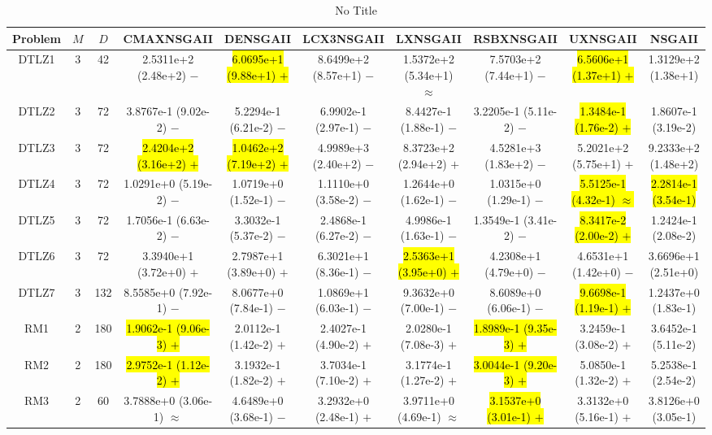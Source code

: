 \documentclass[journal]{IEEEtran}
\begin{document}
\begin{table*}[htbp]
\renewcommand{\arraystretch}{1.2}
\centering
\caption{No Title}
\begin{tabular}{cccccccccc}
\toprule
Problem&$M$&$D$&CMAXNSGAII&DENSGAII&LCX3NSGAII&LXNSGAII&RSBXNSGAII&UXNSGAII&NSGAII\\
\midrule
\multirow{1}{*}{DTLZ1}&3&42&2.5311e+2 (2.48e+2) $-$&\hl{6.0695e+1 (9.88e+1) $+$}&8.6499e+2 (8.57e+1) $-$&1.5372e+2 (5.34e+1) $\approx$&7.5703e+2 (7.44e+1) $-$&\hl{6.5606e+1 (1.37e+1) $+$}&1.3129e+2 (1.38e+1)\\
\hline
\multirow{1}{*}{DTLZ2}&3&72&3.8767e-1 (9.02e-2) $-$&5.2294e-1 (6.21e-2) $-$&6.9902e-1 (2.97e-1) $-$&8.4427e-1 (1.88e-1) $-$&3.2205e-1 (5.11e-2) $-$&\hl{1.3484e-1 (1.76e-2) $+$}&1.8607e-1 (3.19e-2)\\
\hline
\multirow{1}{*}{DTLZ3}&3&72&\hl{2.4204e+2 (3.16e+2) $+$}&\hl{1.0462e+2 (7.19e+2) $+$}&4.9989e+3 (2.40e+2) $-$&8.3723e+2 (2.94e+2) $+$&4.5281e+3 (1.83e+2) $-$&5.2021e+2 (5.75e+1) $+$&9.2333e+2 (1.48e+2)\\
\hline
\multirow{1}{*}{DTLZ4}&3&72&1.0291e+0 (5.19e-2) $-$&1.0719e+0 (1.52e-1) $-$&1.1110e+0 (3.58e-2) $-$&1.2644e+0 (1.62e-1) $-$&1.0315e+0 (1.29e-1) $-$&\hl{5.5125e-1 (4.32e-1) $\approx$}&\hl{2.2814e-1 (3.54e-1)}\\
\hline
\multirow{1}{*}{DTLZ5}&3&72&1.7056e-1 (6.63e-2) $-$&3.3032e-1 (5.37e-2) $-$&2.4868e-1 (6.27e-2) $-$&4.9986e-1 (1.63e-1) $-$&1.3549e-1 (3.41e-2) $-$&\hl{8.3417e-2 (2.00e-2) $+$}&1.2424e-1 (2.08e-2)\\
\hline
\multirow{1}{*}{DTLZ6}&3&72&3.3940e+1 (3.72e+0) $+$&2.7987e+1 (3.89e+0) $+$&6.3021e+1 (8.36e-1) $-$&\hl{2.5363e+1 (3.95e+0) $+$}&4.2308e+1 (4.79e+0) $-$&4.6531e+1 (1.42e+0) $-$&3.6696e+1 (2.51e+0)\\
\hline
\multirow{1}{*}{DTLZ7}&3&132&8.5585e+0 (7.92e-1) $-$&8.0677e+0 (7.84e-1) $-$&1.0869e+1 (6.03e-1) $-$&9.3632e+0 (7.00e-1) $-$&8.6089e+0 (6.06e-1) $-$&\hl{9.6698e-1 (1.19e-1) $+$}&1.2437e+0 (1.83e-1)\\
\hline
\multirow{1}{*}{RM1}&2&180&\hl{1.9062e-1 (9.06e-3) $+$}&2.0112e-1 (1.42e-2) $+$&2.4027e-1 (4.90e-2) $+$&2.0280e-1 (7.08e-3) $+$&\hl{1.8989e-1 (9.35e-3) $+$}&3.2459e-1 (3.08e-2) $+$&3.6452e-1 (5.11e-2)\\
\hline
\multirow{1}{*}{RM2}&2&180&\hl{2.9752e-1 (1.12e-2) $+$}&3.1932e-1 (1.82e-2) $+$&3.7034e-1 (7.10e-2) $+$&3.1774e-1 (1.27e-2) $+$&\hl{3.0044e-1 (9.20e-3) $+$}&5.0850e-1 (1.32e-2) $+$&5.2538e-1 (2.54e-2)\\
\hline
\multirow{1}{*}{RM3}&2&60&3.7888e+0 (3.06e-1) $\approx$&4.6489e+0 (3.68e-1) $-$&3.2932e+0 (2.48e-1) $+$&3.9711e+0 (4.69e-1) $\approx$&\hl{3.1537e+0 (3.01e-1) $+$}&3.3132e+0 (5.16e-1) $+$&3.8126e+0 (3.05e-1)\\

\end{tabular}
\end{table*}
\end{document}
